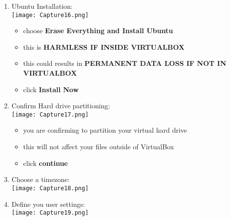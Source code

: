 \documentclass[12pt]{article}
\begin{document}
\begin{description}
\begin{description}
\begin{enumerate}[label=\alph*)]
\vspace{5mm} 
\newpage
\item Ubuntu Installation: \vspace{5mm} \\
      		\hspace*{-2.5cm}\texttt{[image: Capture16.png]}\\
             \begin{itemize}
          \item choose {\bf Erase Everything and Install Ubuntu}
          \item this is {\bf HARMLESS IF INSIDE VIRTUALBOX }
          \item this could results in {\bf PERMANENT DATA LOSS IF NOT IN VIRTUALBOX}
          \item click {\bf Install Now}          
                 

            \end{itemize}

\vspace{5mm} 
\item Confirm Hard drive partitioning: \vspace{5mm} \\
      		\hspace*{-2.5cm}\texttt{[image: Capture17.png]}
      		 \begin{itemize}
                    
                 \item you are confirming to partition your virtual hard drive 
                 \item this will not affect your files outside of VirtualBox
                 \item click {\bf continue}

            \end{itemize}
      		
	\newpage
\item Choose a timezone: \vspace{5mm} \\
      		\hspace*{-2.5cm}\texttt{[image: Capture18.png]}\\
			

\vspace{5mm} 
\item Define you user settings: \vspace{5mm} \\
      		\hspace*{-2.5cm}\texttt{[image: Capture19.png]}
			\begin{itemize}
                 

\end{itemize}
\end{enumerate}
\end{description}
\end{description}
\end{document}
